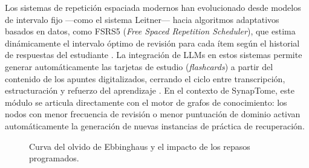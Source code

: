 Los sistemas de repetición espaciada modernos han evolucionado desde modelos de 
intervalo fijo —como el sistema Leitner— hacia algoritmos adaptativos basados en 
datos, como FSRS5 (\textit{Free Spaced Repetition Scheduler}), que estima dinámicamente 
el intervalo óptimo de revisión para cada ítem según el historial de respuestas del 
estudiante \parencite{SpacedRepetitionLLM2025}. La integración de LLMs en estos sistemas 
permite generar automáticamente las tarjetas de estudio (\textit{flashcards}) a partir 
del contenido de los apuntes digitalizados, cerrando el ciclo entre transcripción, 
estructuración y refuerzo del aprendizaje \parencite{SpacedRepetitionLLM2025}. En el 
contexto de SynapTome, este módulo se articula directamente con el motor de grafos de 
conocimiento: los nodos con menor frecuencia de revisión o menor puntuación de dominio 
activan automáticamente la generación de nuevas instancias de práctica de recuperación.

\begin{figure}[H]
    \centering
    \caption{Curva del olvido de Ebbinghaus y el impacto de los repasos programados.}
    \label{fig:forgetting_curve_rep_esp}
\end{figure}


